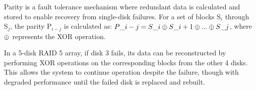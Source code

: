 \documentclass[../../compsys.tex]{subfiles}
\begin{document}
\begin{definition}[Parity]
Parity is a fault tolerance mechanism where redundant data is calculated and stored to enable recovery from single-disk failures. For a set of blocks S$_i$ through S$_j$, the parity P$_{i-j}$ is calculated as: 
$P\_{i-j} = S\_{i} \oplus S\_{i+1} \oplus ... \oplus S\_{j}$, where $\oplus$ represents the XOR operation.
\end{definition}


\begin{example}
In a 5-disk RAID 5 array, if disk 3 fails, its data can be reconstructed by performing XOR operations on the corresponding blocks from the other 4 disks. This allows the system to continue operation despite the failure, though with degraded performance until the failed disk is replaced and rebuilt.
\end{example}
\end{document}
